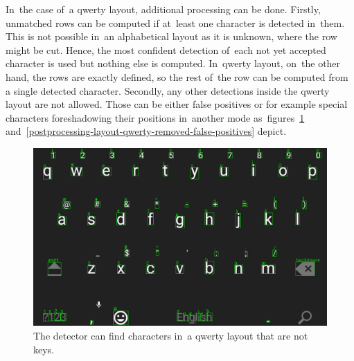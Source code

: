 In~the case of~a qwerty layout, additional processing can be done. Firstly, unmatched rows can be computed if at~least one character is detected in~them. This is not possible in~an alphabetical layout as it is unknown, where the row might be cut. Hence, the most confident detection of~each not yet accepted character is used but nothing else is computed. In~qwerty layout, on~the other hand, the rows are exactly defined, so the rest of~the row can be computed from a single detected character. Secondly, any other detections inside the qwerty layout are not allowed. Those can be either false positives or for example special characters foreshadowing their positions in~another mode as~figures~\ref{postprocessing-layout-qwerty-false-positives} and~\ref{postprocessing-layout-qwerty-removed-false-positives} depict.

\vspace{-4pt}
\begin{figure}[hbt]
    \includegraphics[width=1\textwidth]{img/design/postprocessing-layout-qwerty-false-positives.png}
    \vspace{-15pt}
    \caption{The detector can find characters in~a qwerty layout that are not keys.}
    \label{postprocessing-layout-qwerty-false-positives}
\end{figure}

